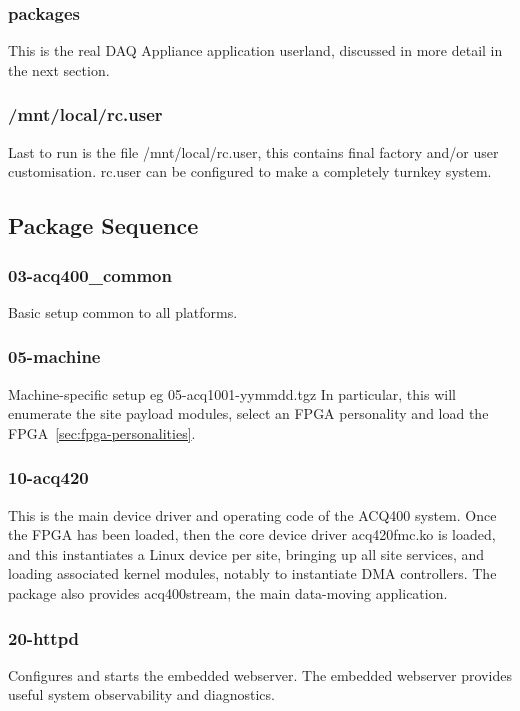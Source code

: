 \documentclass[]{article}
\begin{document}
\subsubsection{packages}
This is the real DAQ Appliance application userland, discussed in more detail in the next section.

\subsubsection{/mnt/local/rc.user}
Last to run is the file /mnt/local/rc.user, this contains final factory and/or user customisation. rc.user can be configured to make a completely turnkey system.

\subsection{Package Sequence}


\subsubsection{03-acq400_common}
Basic setup common to all platforms.

\subsubsection{05-machine}
Machine-specific setup eg 05-acq1001-yymmdd.tgz
In particular, this will enumerate the site payload modules, select an FPGA personality and load the FPGA~\ref{sec:fpga-personalities}.

\subsubsection{10-acq420}
This is the main device driver and operating code of the ACQ400 system.
Once the FPGA has been loaded, then the core device driver acq420fmc.ko is loaded, and this instantiates a Linux device per site, bringing up all site services, and loading associated kernel modules, notably to instantiate DMA controllers. The package also provides acq400stream, the main data-moving application.

\subsubsection{20-httpd}
Configures and starts the embedded webserver. The embedded webserver provides useful system observability and diagnostics.
\end{document}
